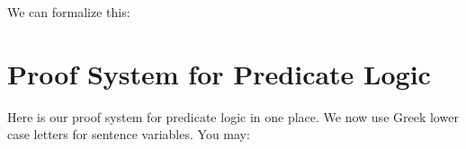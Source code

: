 We can formalize this:


\begin{argumentN}[1]









\end{argumentN}






\section{Proof System for Predicate Logic}

Here is our proof system for predicate logic in one place. We now use Greek 
lower case letters for sentence variables. You may: 

